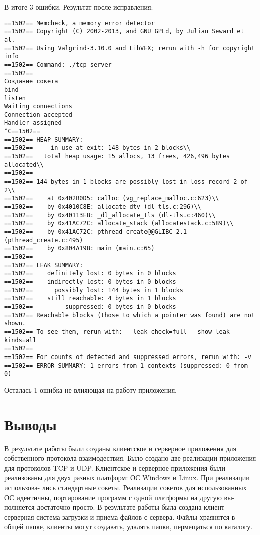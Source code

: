 \documentclass[12pt,a4paper]{report}
\begin{document}
В итоге 3 ошибки. Результат после исправления:
\begin{lstlisting}
==1502== Memcheck, a memory error detector
==1502== Copyright (C) 2002-2013, and GNU GPLd, by Julian Seward et al.
==1502== Using Valgrind-3.10.0 and LibVEX; rerun with -h for copyright info
==1502== Command: ./tcp_server
==1502== 
Создание сокета
bind
listen
Waiting connections
Connection accepted
Handler assigned
^C==1502== 
==1502== HEAP SUMMARY:
==1502==     in use at exit: 148 bytes in 2 blocks\\
==1502==   total heap usage: 15 allocs, 13 frees, 426,496 bytes allocated\\
==1502== 
==1502== 144 bytes in 1 blocks are possibly lost in loss record 2 of 2\\
==1502==    at 0x402B0D5: calloc (vg_replace_malloc.c:623)\\
==1502==    by 0x4010C8E: allocate_dtv (dl-tls.c:296)\\
==1502==    by 0x40113EB: _dl_allocate_tls (dl-tls.c:460)\\
==1502==    by 0x41AC72C: allocate_stack (allocatestack.c:589)\\
==1502==    by 0x41AC72C: pthread_create@@GLIBC_2.1 (pthread_create.c:495)
==1502==    by 0x804A19B: main (main.c:65)
==1502== 
==1502== LEAK SUMMARY:
==1502==    definitely lost: 0 bytes in 0 blocks
==1502==    indirectly lost: 0 bytes in 0 blocks
==1502==      possibly lost: 144 bytes in 1 blocks
==1502==    still reachable: 4 bytes in 1 blocks
==1502==         suppressed: 0 bytes in 0 blocks
==1502== Reachable blocks (those to which a pointer was found) are not shown.
==1502== To see them, rerun with: --leak-check=full --show-leak-kinds=all
==1502== 
==1502== For counts of detected and suppressed errors, rerun with: -v
==1502== ERROR SUMMARY: 1 errors from 1 contexts (suppressed: 0 from 0)
\end{lstlisting}
Осталась 1 ошибка не влияющая на работу приложения.\\

\chapter{Выводы}
В результате работы были созданы клиентское и серверное приложения для собственного протокола взаимодествия. Было создано две реализации приложения для протоколов TCP и
UDP. Клиентское и серверное приложения были реализованы для двух
разных платформ: ОС Windows и Linux. При реализации использова-
лись стандартные сокеты. Реализации сокетов для использованных ОС
идентичны, портирование программ с одной платформы на другую вы-
полняется достаточно просто.
В результате работы была создана клиент-серверная система загрузки и приема файлов с сервера.
Файлы храянятся в общей папке, клиенты могут создавать, удалять папки, пермещаться по каталогу.
\end{document}
